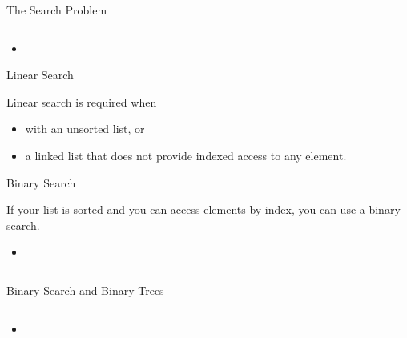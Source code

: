 \documentclass{beamer}
\author[Chris Simpkins] 
{Christopher Simpkins \\\texttt{chris.simpkins@gatech.edu}}
\institute[Georgia Tech] %
\date[CS 1331]{}
\begin{document}
\begin{frame}
  \titlepage
\end{frame}



\begin{frame}[fragile]{The Search Problem}


\begin{lstlisting}[language=Java]

\end{lstlisting}

\begin{itemize}
\item
\end{itemize}


\end{frame}


\begin{frame}[fragile]{Linear Search}


Linear search is required when
\begin{itemize}
\item with an unsorted list, or
\item a linked list that does not provide indexed access to any element.
\end{itemize}


\end{frame}


\begin{frame}[fragile]{Binary Search}


If your list is sorted and you can access elements by index, you can use a binary search.
\begin{itemize}
\item
\end{itemize}

\begin{lstlisting}[language=Java]

\end{lstlisting}


\end{frame}


\begin{frame}[fragile]{Binary Search and Binary Trees}


\begin{lstlisting}[language=Java]

\end{lstlisting}

\begin{itemize}
\item
\end{itemize}


\end{frame}
\end{document}
